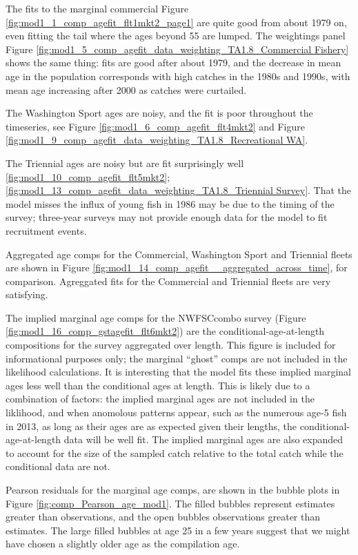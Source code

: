 \documentclass[12pt,]{article}
\begin{document}
The fits to the marginal commercial Figure
\ref{fig:mod1_1_comp_agefit_flt1mkt2_page1} are quite good from about
1979 on, even fitting the tail where the ages beyond 55 are lumped. The
weightings panel Figure
\ref{fig:mod1_5_comp_agefit_data_weighting_TA1.8_Commercial Fishery}
shows the same thing: fits are good after about 1979, and the decrease
in mean age in the population corresponds with high catches in the 1980s
and 1990s, with mean age increasing after 2000 as catches were
curtailed.

The Washington Sport ages are noisy, and the fit is poor throughout the
timeseries, see Figure \ref{fig:mod1_6_comp_agefit_flt4mkt2} and Figure
\ref{fig:mod1_9_comp_agefit_data_weighting_TA1.8_Recreational WA}.

The Triennial ages are noisy but are fit surprisingly well
\ref{fig:mod1_10_comp_agefit_flt5mkt2};
\ref{fig:mod1_13_comp_agefit_data_weighting_TA1.8_Triennial Survey}.
That the model misses the influx of young fish in 1986 may be due to the
timing of the survey; three-year surveys may not provide enough data for
the model to fit recruitment events.

Aggregated age comps for the Commercial, Washington Sport and Triennial
fleets are shown in Figure
\ref{fig:mod1_14_comp_agefit__aggregated_across_time}, for comparison.
Agreggated fits for the Commercial and Triennial fleets are very
satisfying.

The implied marginal age comps for the NWFSCcombo survey (Figure
\ref{fig:mod1_16_comp_gstagefit_flt6mkt2}) are the
conditional-age-at-length compositions for the survey aggregated over
length. This figure is included for informational purposes only; the
marginal ``ghost'' comps are not included in the likelihood
calculations. It is interesting that the model fits these implied
marginal ages less well than the conditional ages at length. This is
likely due to a combination of factors: the implied marginal ages are
not included in the liklihood, and when anomolous patterns appear, such
as the numerous age-5 fish in 2013, as long as their ages are as
expected given their lengths, the conditional-age-at-length data will be
well fit. The implied marginal ages are also expanded to account for the
size of the sampled catch relative to the total catch while the
conditional data are not.

Pearson residuals for the marginal age comps, are shown in the bubble
plots in Figure \ref{fig:comp_Pearson_age_mod1}. The filled bubbles
represent estimates greater than observations, and the open bubbles
observations greater than estimates. The large filled bubbles at age 25
in a few years suggest that we might have chosen a slightly older age as
the compilation age.
\end{document}
